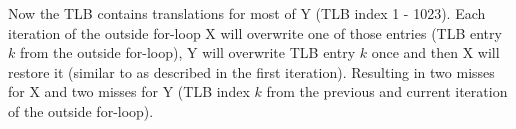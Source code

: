 \documentclass[a4paper, 11pt]{exam}
\begin{document}
\begin{enumerate}
Now the TLB contains translations for most of Y (TLB index 1 - 1023). Each iteration of the outside for-loop X will overwrite one of those entries (TLB entry $k$ from the outside for-loop), Y will overwrite TLB entry $k$ once and then X will restore it (similar to as described in the first iteration). Resulting in two misses for X and two misses for Y (TLB index $k$ from the previous and current iteration of the outside for-loop). \\


\end{enumerate}
\end{document}
